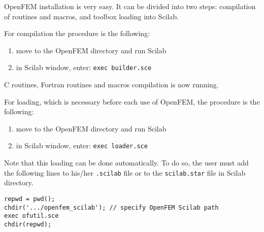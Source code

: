 OpenFEM installation is very easy. It can be divided into two steps: compilation of routines and macros, and toolbox loading into Scilab.  

For compilation the procedure is the following:
\begin{enumerate}
\item move to the OpenFEM directory and run Scilab
\item in Scilab window, enter: \verb+exec builder.sce+
\end{enumerate}
C routines, Fortran routines and macros compilation is now running.

For loading, which is necessary before each use of OpenFEM, the procedure is the following:
\begin{enumerate}
\item move to the OpenFEM directory and run Scilab
\item in Scilab window, enter: \verb+exec loader.sce+
\end{enumerate}
Note that this loading can be done automatically. To do so, the user must add the following lines to his/her \verb+.scilab+ file or to the \verb+scilab.star+ file in Scilab directory.
\begin{verbatim}
repwd = pwd();
chdir('.../openfem_scilab'); // specify OpenFEM Scilab path 
exec ofutil.sce
chdir(repwd);
\end{verbatim}


